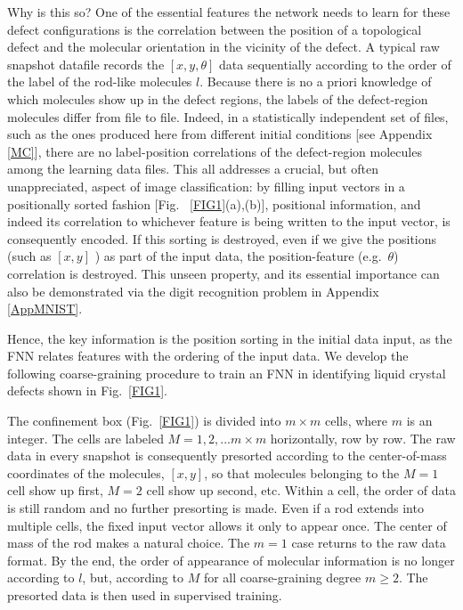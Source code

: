 Why is this so?
One of the essential features the network needs to learn for these defect configurations is the correlation between the position of a topological defect and the molecular orientation in the vicinity of the defect. A typical raw snapshot datafile records the $[x,y,\theta]$ data sequentially according to the order of the label of the rod-like molecules $l$. Because there is no a priori knowledge of which molecules show up in the defect regions, the labels of the defect-region molecules differ from file to file. Indeed, in a statistically independent set of files, such as the ones produced here from different initial conditions [see Appendix \ref{MC}], there are no label-position correlations of the defect-region molecules among the learning data files.
This all addresses a crucial, but often unappreciated, aspect of image classification: by filling input vectors in a positionally sorted fashion [Fig.~ \ref{FIG1}(a),(b)], positional information, and indeed its correlation to whichever feature is being written to the input vector, is consequently encoded. If this sorting is destroyed, even if we give the positions (such as $[x,y]$
) as part of the input data, the position-feature (e.g.\ $\theta$) correlation is destroyed. This unseen property, and its essential importance can also be demonstrated via the digit recognition problem in Appendix \ref{AppMNIST}.

Hence, the key information is the position sorting in the initial data input, as the FNN relates features with the ordering of the input data. We develop the following coarse-graining procedure to train an FNN in identifying liquid crystal defects shown in Fig.~\ref{FIG1}.

The confinement box (Fig.~\ref{FIG1}) is divided into $m\times m$ cells, where $m$ is an integer. The cells are labeled $M=1,2,...m\times m$ horizontally, row by row.
The raw data in every snapshot is consequently presorted according to
the center-of-mass coordinates of the molecules, $[x,y]$, so that molecules belonging to the $M=1$ cell show up first, $M=2$ cell show up second, etc. Within a cell, the order of data is still random and no further presorting is made.
Even if a rod extends into multiple cells, the fixed input vector allows it only to appear once. The center of mass of the rod makes a natural choice.
The $m=1$ case returns to the raw data format. By the end, the order of appearance of molecular information is no longer according to $l$, but, according to $M$ for all coarse-graining degree $m\ge 2$. The presorted data is then used in supervised training.

